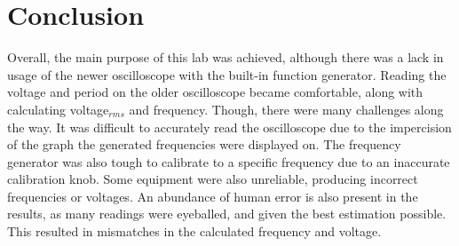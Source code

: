 \documentclass{article}
\begin{document}
		\section*{Conclusion}
Overall, the main purpose of this lab was achieved, although there was a lack in usage of the newer oscilloscope with the built-in function generator. Reading the voltage and period on the older oscilloscope became comfortable, along with calculating voltage$_{rms}$ and frequency. Though, there were many challenges along the way. It was difficult to accurately read the oscilloscope due to the impercision of the graph the generated frequencies were displayed on. The frequency generator was also tough to calibrate to a specific frequency due to an inaccurate calibration knob. Some equipment were also unreliable, producing incorrect frequencies or voltages. An abundance of human error is also present in the results, as many readings were eyeballed, and given the best estimation possible. This resulted in mismatches in the calculated frequency and voltage. 
	
\end{document}
